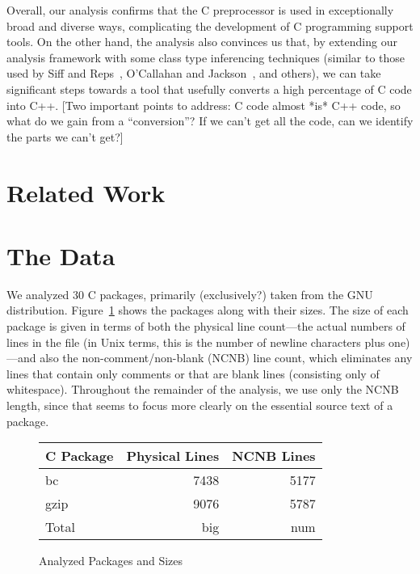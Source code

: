 Overall, our analysis confirms that the C preprocessor is used in
exceptionally broad and diverse ways, complicating the development of C
programming support tools.  On the other hand, the analysis also
convinces us that, by extending our analysis framework with some class
type inferencing techniques (similar to those used by Siff and
Reps~\cite{Siff-fse96}, O'Callahan and Jackson~\cite{OCallahan-icse97},
and others), we can take significant steps towards a tool that usefully
converts a high percentage of C code into C++.  [Two important points to
address: C code almost *is* C++ code, so what do we gain from a
``conversion''?  If we can't get all the code, can we identify the parts
we can't get?]

\section{Related Work}\label{sec:related}

\section{The Data}\label{sec:gathering}

We analyzed 30 C packages, primarily (exclusively?) taken from the GNU
distribution.  Figure~\ref{fig:packages} shows the packages along with
their sizes.  The size of each package is given in terms of both the
physical line count---the actual numbers of lines in the file (in Unix
terms, this is the number of newline characters plus one)---and also
the non-comment/non-blank (NCNB) line count, which eliminates any
lines that contain only comments or that are blank lines (consisting
only of whitespace).  Throughout the remainder of the analysis, we use
only the NCNB length, since that seems to focus more clearly on the
essential source text of a package.

\begin{figure}
\begin{tabular}{|l|r|r|}\\\hline
C Package & Physical Lines & NCNB Lines\\\hline\hline
bc & 7438 & 5177\\\hline
gzip & 9076 & 5787\\\hline

Total & big & num\\\hline
\end{tabular}

\caption{Analyzed Packages and Sizes\label{fig:packages}}
\end{figure}

